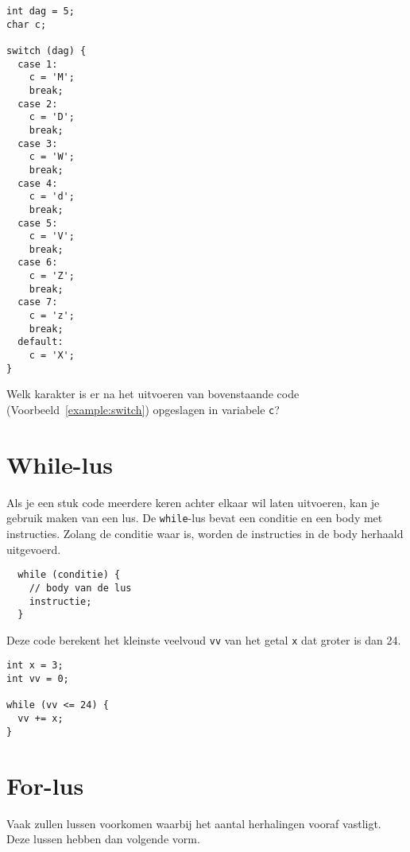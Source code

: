 \documentclass[11pt,fleqn]{book} %
\begin{document}
\begin{example}
	\label{example:switch}
	\phantom{ }
	\begin{verbatim}
int dag = 5;
char c;

switch (dag) {
  case 1:
    c = 'M';
    break;
  case 2:
    c = 'D';
    break;
  case 3:
    c = 'W';
    break;
  case 4:
    c = 'd';
    break;
  case 5:
    c = 'V';
    break;
  case 6:
    c = 'Z';
    break;
  case 7:
    c = 'z';
    break;
  default:
    c = 'X';
}
	\end{verbatim}
\end{example}

\begin{exercise}
	Welk karakter is er na het uitvoeren van bovenstaande code (Voorbeeld~\ref{example:switch}) opgeslagen in variabele \texttt{c}?
\end{exercise}

\section{While-lus}
Als je een stuk code meerdere keren achter elkaar wil laten uitvoeren, kan je gebruik maken van een lus. De \texttt{while}-lus bevat een conditie en een body met instructies. Zolang de conditie waar is, worden de instructies in de body herhaald uitgevoerd.

\begin{definition}[While]
	\phantom{ }
	\begin{verbatim}
  while (conditie) {
    // body van de lus
    instructie;
  }
	\end{verbatim}
	\vspace{0cm}
\end{definition}

\begin{example}[While]
	Deze code berekent het kleinste veelvoud \texttt{vv} van het getal \texttt{x} dat groter is dan 24.
	\begin{verbatim}
int x = 3;
int vv = 0;

while (vv <= 24) {
  vv += x;
}
	\end{verbatim}
\end{example}

\section{For-lus}
Vaak zullen lussen voorkomen waarbij het aantal herhalingen vooraf vastligt. Deze lussen hebben dan volgende vorm.
\end{document}
